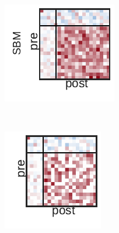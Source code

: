 \begin{figure}[t!]
\begin{subfigure}[b]{1.10in}
  \end{subfigure}
  \\
  \begin{subfigure}[b]{1.25in}
    \centering
    \includegraphics[width=\textwidth]{figures/ch3/Dense-SBM.pdf}
  \end{subfigure}
  ~
  \begin{subfigure}[b]{1.10in}
    \centering
    \includegraphics[width=\textwidth]{figures/ch3/Bernoulli-SBM.pdf}

\end{subfigure}
\end{figure}
